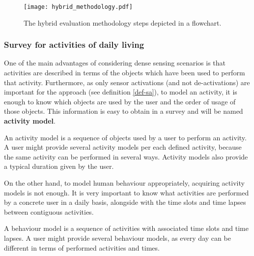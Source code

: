 \begin{figure}[htbp]
\centering
\texttt{[image: hybrid\_methodology.pdf]}
    \caption{The hybrid evaluation methodology steps depicted in a flowchart.}
    \label{fig-methodology}
\end{figure}

\subsubsection{Survey for activities of daily living}
\label{subsubsec:evaluation:survey}
\begin{comment}
 - Explain each of the questions of the survey
 - Show a screenshot and provide the link to the Google Form
 - Google Forms guarantee users' anonymity
 - Explain survey-script translation criteria
\end{comment}

One of the main advantages of considering dense sensing scenarios is that activities are described in terms of the objects which have been used to perform that activity. Furthermore, as only sensor activations (and not de-activations) are important for the approach (see definition \ref{def-sa}), to model an activity, it is enough to know which objects are used by the user and the order of usage of those objects. This information is easy to obtain in a survey and will be named \textbf{activity model}.

\begin{defn}
\label{def-act-model}
 An activity model is a sequence of objects used by a user to perform an activity. A user might provide several activity models per each defined activity, because the same activity can be performed in several ways. Activity models also provide a typical duration given by the user.
\end{defn}

On the other hand, to model human behaviour appropriately, acquiring activity models is not enough. It is very important to know what activities are performed by a concrete user in a daily basis, alongside with the time slots and time lapses between contiguous activities. 

\begin{defn}
\label{def-behaviour}
 A behaviour model is a sequence of activities with associated time slots and time lapses. A user might provide several behaviour models, as every day can be different in terms of performed activities and times.
\end{defn}

